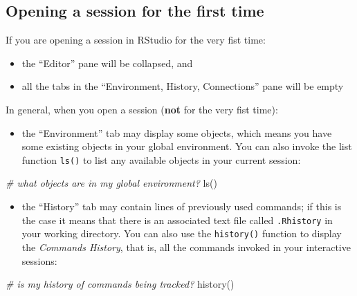 \documentclass[
]{book}
\newenvironment{Shaded}{\begin{snugshade}}{\end{snugshade}}
\newcommand{\CommentTok}[1]{\textcolor[rgb]{0.56,0.35,0.01}{\textit{#1}}}
\newcommand{\FunctionTok}[1]{\textcolor[rgb]{0.00,0.00,0.00}{#1}}
\newcommand{\NormalTok}[1]{#1}
\providecommand{\tightlist}{%
  \setlength{\itemsep}{0pt}\setlength{\parskip}{0pt}}
\begin{document}
\hypertarget{opening-a-session-for-the-first-time}{%
\subsection{Opening a session for the first time}\label{opening-a-session-for-the-first-time}}

If you are opening a session in RStudio for the very fist time:

\begin{itemize}
\item
  the ``Editor'' pane will be collapsed, and
\item
  all the tabs in the ``Environment, History, Connections'' pane will be empty
\end{itemize}

In general, when you open a session (\textbf{not} for the very fist time):

\begin{itemize}
\tightlist
\item
  the ``Environment'' tab may display some objects, which means you have some
  existing objects in your global environment. You can also invoke the list
  function \texttt{ls()} to list any available objects in your current session:
\end{itemize}

\begin{Shaded}
\begin{Highlighting}[]
\CommentTok{\# what objects are in my global environment?}
\FunctionTok{ls}\NormalTok{()}
\end{Highlighting}
\end{Shaded}

\begin{itemize}
\tightlist
\item
  the ``History'' tab may contain lines of previously used commands; if this is
  the case it means that there is an associated text file called \texttt{.Rhistory} in
  your working directory. You can also use the \texttt{history()} function to display
  the \emph{Commands History}, that is, all the commands invoked in your interactive
  sessions:
\end{itemize}

\begin{Shaded}
\begin{Highlighting}[]
\CommentTok{\# is my history of commands being tracked?}
\FunctionTok{history}\NormalTok{()}
\end{Highlighting}
\end{Shaded}
\end{document}
